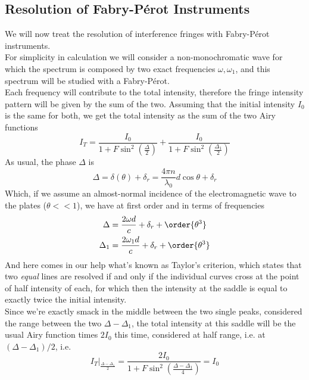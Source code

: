 \documentclass[../electromagnetism.tex]{subfiles}
\begin{document}
\subsection{Resolution of Fabry-Pérot Instruments}
We will now treat the resolution of interference fringes with Fabry-Pérot instruments.\\
For simplicity in calculation we will consider a non-monochromatic wave for which the spectrum is composed by two exact frequencies $\omega,\omega_1$, and this spectrum will be studied with a Fabry-Pérot.\\
Each frequency will contribute to the total intensity, therefore the fringe intensity pattern will be given by the sum of the two. Assuming that the initial intensity $I_0$ is the same for both, we get the total intensity as the sum of the two Airy functions
\begin{equation}
	I_T=\frac{I_0}{1+F\sin^2\left( \frac{\Delta}{2} \right)}+\frac{I_0}{1+F\sin^2\left( \frac{\Delta_1}{2} \right)}
	\label{eq:intensityrfpi}
\end{equation}
As usual, the phase $\Delta$ is
\begin{equation*}
	\Delta=\delta(\theta)+\delta_r=\frac{4\pi n}{\lambda_0}d\cos\theta+\delta_r
\end{equation*}
Which, if we assume an almost-normal incidence of the electromagnetic wave to the plates ($\theta<<1$), we have at first order and in terms of frequencies
\begin{equation*}
	\begin{aligned}
		\Delta&= \frac{2\omega d}{c}+\delta_r+\order{\theta^3}\\
		\Delta_1&= \frac{2\omega_1d}{c}+\delta_r+\order{\theta^3}
	\end{aligned}
\end{equation*}
And here comes in our help what's known as Taylor's criterion, which states that two \textit{equal} lines are resolved if and only if the individual curves cross at the point of half intensity of each, for which then the intensity at the saddle is equal to exactly twice the initial intensity.\\
Since we're exactly smack in the middle between the two single peaks, considered the range between the two $\Delta-\Delta_1$, the total intensity at this saddle will be the usual Airy function times $2I_0$ this time, considered at half range, i.e. at $(\Delta-\Delta_1)/2$, i.e.
\begin{equation}
	\left. I_T \right|_{\frac{\Delta-\Delta_1}{2}}=\frac{2I_0}{1+F\sin^2\left( \frac{\Delta-\Delta_1}{4} \right)}=I_0
	\label{eq:saddleintfpir}
\end{equation}
\end{document}
